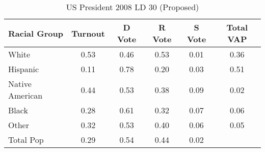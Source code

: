 \begin{table}[htb]
\begin{center}
\caption{US President 2008 LD 30 (Proposed)}
\label{pres08_vap_ld_30}
\begin{tabular}{lccccc}
  \hline
Racial Group & Turnout & D Vote & R Vote & S Vote & Total VAP \\ 
  \hline
White & 0.53 & 0.46 & 0.53 & 0.01 & 0.36 \\ 
  Hispanic & 0.11 & 0.78 & 0.20 & 0.03 & 0.51 \\ 
  Native American & 0.44 & 0.53 & 0.38 & 0.09 & 0.02 \\ 
  Black & 0.28 & 0.61 & 0.32 & 0.07 & 0.06 \\ 
  Other & 0.32 & 0.53 & 0.40 & 0.06 & 0.05 \\ 
  Total Pop & 0.29 & 0.54 & 0.44 & 0.02 &  \\ 
   \hline
\end{tabular}
\end{center}
\end{table}
